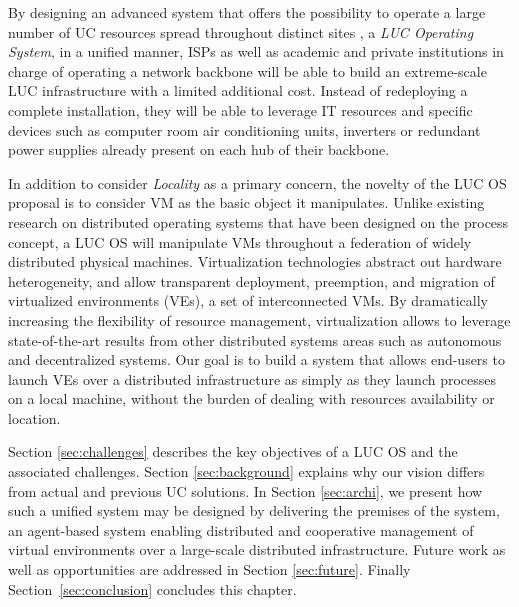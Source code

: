 \begin{svgraybox}
By designing an advanced system that offers the possibility to operate a large
number of UC resources spread throughout distinct sites \ie, a \emph{LUC
  Operating System}, in a unified manner,
ISPs as well as academic and private institutions in
charge of operating a network backbone will be able to build an extreme-scale
LUC infrastructure with a limited additional cost. Instead of redeploying a
complete installation, they will be able to leverage IT resources and
specific devices such as computer room air conditioning units, inverters or
redundant power supplies already present on each hub of their
backbone. 
\end{svgraybox}


\medskip

In addition to consider \emph{Locality} as a primary concern, the novelty of the LUC OS
proposal is to consider VM as the basic object it manipulates.  Unlike existing
research on distributed operating systems that have been designed on the process concept, a LUC OS will manipulate VMs throughout a federation of widely distributed
physical machines. Virtualization technologies abstract out hardware heterogeneity, and allow
transparent deployment, preemption, and migration of virtualized
environments (VEs), \ie a set of interconnected VMs.
By dramatically increasing the flexibility of resource management, virtualization 
allows to leverage state-of-the-art results from other distributed
systems areas such as autonomous and decentralized systems.  
Our goal is to build a system that allows end-users to launch VEs over a
distributed infrastructure as simply as they launch processes on a
local machine, \ie  without the burden of dealing with resources
availability or location.

Section \ref{sec:challenges} describes the key objectives of a LUC OS and the associated challenges. 
Section \ref{sec:background} explains why our vision differs from actual and previous UC solutions. In
Section \ref{sec:archi}, we present how such a unified system may be designed
by delivering the premises of the \discovery system, an agent-based system
enabling distributed and cooperative management of virtual environments over a
large-scale distributed infrastructure.
Future work as well as opportunities  are addressed in Section \ref{sec:future}. Finally Section~\ref{sec:conclusion} concludes this chapter. 
